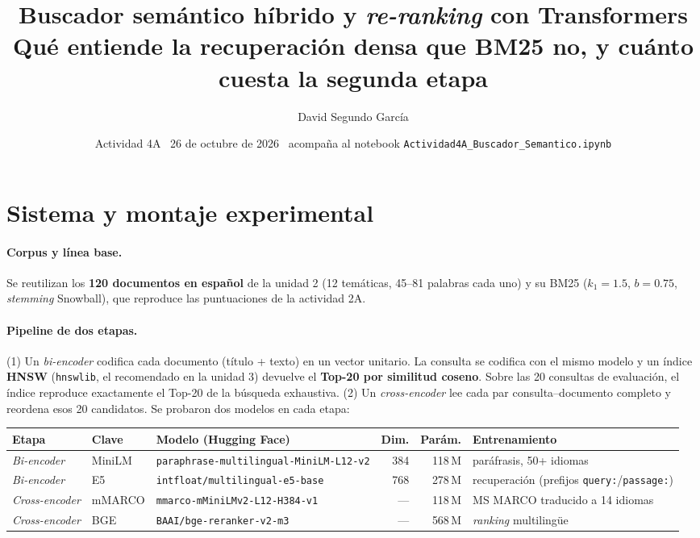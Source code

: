 \documentclass[10pt,a4paper]{article}
\title{\vspace{-1.5cm}\textbf{Buscador semántico híbrido y \emph{re-ranking} con Transformers}\\[2pt]
\large Qué entiende la recuperación densa que BM25 no, y cuánto cuesta la segunda etapa}
\author{David Segundo García}
\date{\vspace{-0.3cm}Actividad 4A \textperiodcentered\ 26 de octubre de 2026
\textperiodcentered\ acompaña al notebook \texttt{Actividad4A\_Buscador\_Semantico.ipynb}}
\begin{document}
\maketitle
\vspace{-0.9cm}

\section{Sistema y montaje experimental}

\paragraph{Corpus y línea base.} Se reutilizan los \textbf{120 documentos en español} de la unidad 2
(12 temáticas, 45--81 palabras cada uno) y su BM25 ($k_1=1.5$, $b=0.75$, \emph{stemming} Snowball), que
reproduce las puntuaciones de la actividad 2A.

\paragraph{Pipeline de dos etapas.} (1) Un \emph{bi-encoder} codifica cada documento (título + texto)
en un vector unitario. La consulta se codifica con el mismo modelo y un índice \textbf{HNSW}
(\texttt{hnswlib}, el recomendado en la unidad 3) devuelve el \textbf{Top-20 por similitud coseno}. Sobre
las 20 consultas de evaluación, el índice reproduce exactamente el Top-20 de la búsqueda exhaustiva. (2)
Un \emph{cross-encoder} lee cada par consulta--documento completo y reordena esos 20 candidatos.
Se probaron dos modelos en cada etapa:

\begin{table}[H]
\centering\footnotesize\setlength{\tabcolsep}{4pt}
\begin{tabular}{@{}lllrrl@{}}
\toprule
\textbf{Etapa} & \textbf{Clave} & \textbf{Modelo (Hugging Face)} & \textbf{Dim.} & \textbf{Parám.} & \textbf{Entrenamiento} \\
\midrule
\emph{Bi-encoder}    & MiniLM & \texttt{paraphrase-multilingual-MiniLM-L12-v2} & 384 & 118\,M & paráfrasis, 50+ idiomas \\
\emph{Bi-encoder}    & E5     & \texttt{intfloat/multilingual-e5-base}          & 768 & 278\,M & recuperación (prefijos \texttt{query:}/\texttt{passage:}) \\
\emph{Cross-encoder} & mMARCO & \texttt{mmarco-mMiniLMv2-L12-H384-v1}           & --- & 118\,M & MS MARCO traducido a 14 idiomas \\
\emph{Cross-encoder} & BGE    & \texttt{BAAI/bge-reranker-v2-m3}                & --- & 568\,M & \emph{ranking} multilingüe \\
\bottomrule
\end{tabular}
\end{table}
\end{document}
